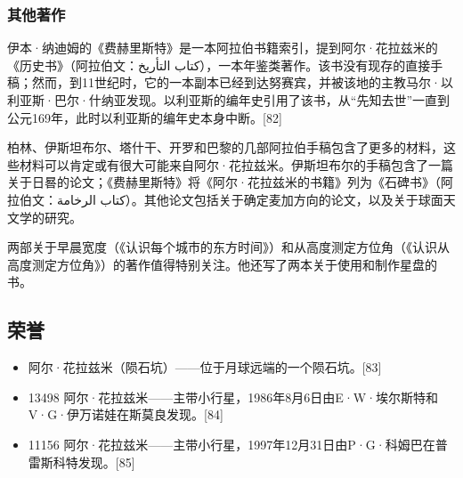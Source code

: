 \subsubsection{其他著作}  
伊本·纳迪姆的《费赫里斯特》是一本阿拉伯书籍索引，提到阿尔·花拉兹米的《历史书》（阿拉伯文：كتاب التأريخ），一本年鉴类著作。该书没有现存的直接手稿；然而，到11世纪时，它的一本副本已经到达努赛宾，并被该地的主教马尔·以利亚斯·巴尔·什纳亚发现。以利亚斯的编年史引用了该书，从“先知去世”一直到公元169年，此时以利亚斯的编年史本身中断。[82]

柏林、伊斯坦布尔、塔什干、开罗和巴黎的几部阿拉伯手稿包含了更多的材料，这些材料可以肯定或有很大可能来自阿尔·花拉兹米。伊斯坦布尔的手稿包含了一篇关于日晷的论文；《费赫里斯特》将《阿尔·花拉兹米的书籍》列为《石碑书》（阿拉伯文：كتاب الرخامة）。其他论文包括关于确定麦加方向的论文，以及关于球面天文学的研究。

两部关于早晨宽度（《认识每个城市的东方时间》）和从高度测定方位角（《认识从高度测定方位角》）的著作值得特别关注。他还写了两本关于使用和制作星盘的书。
\subsection{荣誉}
\begin{itemize}
\item 阿尔·花拉兹米（陨石坑）——位于月球远端的一个陨石坑。[83]  
\item 13498 阿尔·花拉兹米——主带小行星，1986年8月6日由E·W·埃尔斯特和V·G·伊万诺娃在斯莫良发现。[84]  
\item 11156 阿尔·花拉兹米——主带小行星，1997年12月31日由P·G·科姆巴在普雷斯科特发现。[85]
\end{itemize}

